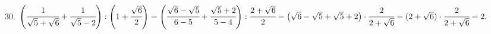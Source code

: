 30. $\left(\cfrac{1}{\sqrt{5}+\sqrt{6}}+\cfrac{1}{\sqrt{5}-2}\right):\left(1+\cfrac{\sqrt{6}}{2}\right)=
\left(\cfrac{\sqrt{6}-\sqrt{5}}{6-5}+\cfrac{\sqrt{5}+2}{5-4}\right):\cfrac{2+\sqrt{6}}{2}=
\left(\sqrt{6}-\sqrt{5}+\sqrt{5}+2\right)\cdot\cfrac{2}{2+\sqrt{6}}=(2+\sqrt{6})\cdot\cfrac{2}{2+\sqrt{6}}=2.$\\
